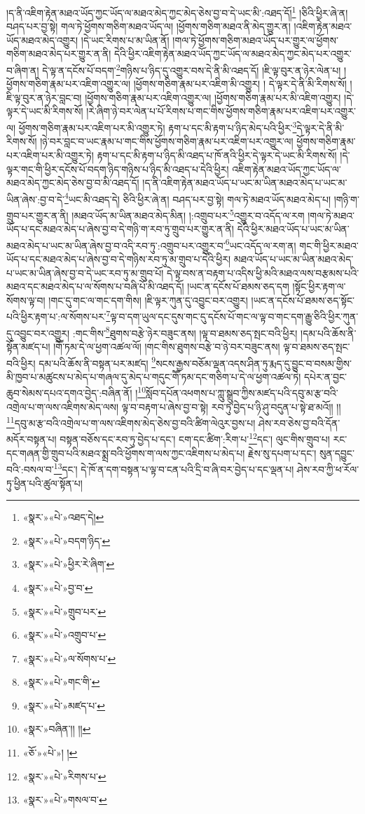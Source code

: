 །ད་ནི་འཇིག་རྟེན་མཐའ་ཡོད་ཀྱང་ཡོད་ལ་མཐའ་མེད་ཀྱང་མེད་ཅེས་བྱ་བ་དེ་ཡང་མི་:འཐད་དོ།\footnote{«སྣར་»«པེ་»འཐད་དེ།} །ཅིའི་ཕྱིར་ཞེ་ན། བཤད་པར་བྱ་སྟེ། གལ་ཏེ་ཕྱོགས་གཅིག་མཐའ་ཡོད་ལ། །ཕྱོགས་གཅིག་མཐའ་ནི་མེད་གྱུར་ན། །འཇིག་རྟེན་མཐའ་ཡོད་མཐའ་མེད་འགྱུར། །དེ་ཡང་རིགས་པ་མ་ཡིན་ནོ། །གལ་ཏེ་ཕྱོགས་གཅིག་མཐའ་ཡོད་པར་གྱུར་ལ་ཕྱོགས་གཅིག་མཐའ་མེད་པར་གྱུར་ན་ནི། དེའི་ཕྱིར་འཇིག་རྟེན་མཐའ་ཡོད་ཀྱང་ཡོད་ལ་མཐའ་མེད་ཀྱང་མེད་པར་འགྱུར་བ་ཞིག་ན། དེ་ལྟ་ན་དངོས་པོ་བདག་\footnote{«སྣར་»«པེ་»བདག་ཉིད་}གཉིས་པ་ཉིད་དུ་འགྱུར་བས་དེ་ནི་མི་འཐད་དོ། །ཇི་ལྟ་བུར་ན་ཉེར་ལེན་པ། །ཕྱོགས་གཅིག་རྣམ་པར་འཇིག་འགྱུར་ལ། །ཕྱོགས་གཅིག་རྣམ་པར་འཇིག་མི་འགྱུར། །
དེ་ལྟར་དེ་ནི་མི་རིགས་སོ། །ཇི་ལྟ་བུར་ན་ཉེར་བླང་བ། །ཕྱོགས་གཅིག་རྣམ་པར་འཇིག་འགྱུར་ལ། །ཕྱོགས་གཅིག་རྣམ་པར་མི་འཇིག་འགྱུར། །དེ་ལྟར་དེ་ཡང་མི་རིགས་སོ། །རེ་ཞིག་ཉེ་བར་ལེན་པ་པོ་རིགས་པ་གང་གིས་ཕྱོགས་གཅིག་རྣམ་པར་འཇིག་པར་འགྱུར་ལ། ཕྱོགས་གཅིག་རྣམ་པར་འཇིག་པར་མི་འགྱུར་ཏེ། རྟག་པ་དང་མི་རྟག་པ་ཉིད་མེད་པའི་ཕྱིར་\footnote{«སྣར་»«པེ་»ཕྱིར་རེ་ཞིག་}དེ་ལྟར་དེ་ནི་མི་རིགས་སོ། །ཉེ་བར་བླང་བ་ཡང་རྣམ་པ་གང་གིས་ཕྱོགས་གཅིག་རྣམ་པར་འཇིག་པར་འགྱུར་ལ། ཕྱོགས་གཅིག་རྣམ་པར་འཇིག་པར་མི་འགྱུར་ཏེ། རྟག་པ་དང་མི་རྟག་པ་ཉིད་མི་འཐད་པ་ཁོ་ནའི་ཕྱིར་དེ་ལྟར་དེ་ཡང་མི་རིགས་སོ། །དེ་ལྟར་གང་གི་ཕྱིར་དངོས་པོ་བདག་ཉིད་གཉིས་པ་ཉིད་མི་འཐད་པ་དེའི་ཕྱིར། འཇིག་རྟེན་མཐའ་ཡོད་ཀྱང་ཡོད་ལ་མཐའ་མེད་ཀྱང་མེད་ཅེས་བྱ་བ་མི་འཐད་དོ། །ད་ནི་འཇིག་རྟེན་མཐའ་ཡོད་པ་ཡང་མ་ཡིན་མཐའ་མེད་པ་ཡང་མ་ཡིན་ཞེས་:བྱ་བ་དེ་\footnote{«སྣར་»«པེ་»བྱ་བ་}ཡང་མི་འཐད་དེ། ཅིའི་ཕྱིར་ཞེ་ན། བཤད་པར་བྱ་སྟེ། གལ་ཏེ་མཐའ་ཡོད་མཐའ་མེད་པ། །གཉི་ག་གྲུབ་པར་གྱུར་ན་ནི། །མཐའ་ཡོད་མ་ཡིན་མཐའ་མེད་མིན། །:འགྲུབ་པར་\footnote{«སྣར་»«པེ་»གྲུབ་པར་}འགྱུར་བ་འདོད་ལ་རག །གལ་ཏེ་མཐའ་ཡོད་པ་དང་མཐའ་མེད་པ་ཞེས་བྱ་བ་དེ་གཉི་ག་རབ་ཏུ་གྲུབ་པར་གྱུར་ན་ནི། དེའི་ཕྱིར་མཐའ་ཡོད་པ་ཡང་མ་ཡིན་མཐའ་མེད་པ་ཡང་མ་ཡིན་ཞེས་བྱ་བ་འདི་རབ་ཏུ་:འགྲུབ་པར་འགྱུར་བ་\footnote{«སྣར་»«པེ་»འགྲུབ་པ་}ཡང་འདོད་ལ་རག་ན། གང་གི་ཕྱིར་མཐའ་ཡོད་པ་དང་མཐའ་མེད་པ་ཞེས་བྱ་བ་དེ་གཉིས་རབ་ཏུ་མ་གྲུབ་པ་དེའི་ཕྱིར། མཐའ་ཡོད་པ་ཡང་མ་ཡིན་མཐའ་མེད་པ་ཡང་མ་ཡིན་ཞེས་བྱ་བ་དེ་ཡང་རབ་ཏུ་མ་གྲུབ་པོ། དེ་ལྟ་བས་ན་བརྟག་པ་འདིས་ཕྱི་མའི་མཐའ་ལས་བརྩམས་པའི་མཐའ་དང་མཐའ་མེད་པ་ལ་སོགས་པ་བཞི་པོ་མི་འཐད་དོ། །ཡང་ན་དངོས་པོ་ཐམས་ཅད་དག །སྟོང་ཕྱིར་རྟག་ལ་སོགས་ལྟ་བ། །གང་དུ་གང་ལ་གང་དག་གིས། །ཇི་ལྟར་ཀུན་དུ་འབྱུང་བར་འགྱུར། །ཡང་ན་དངོས་པོ་ཐམས་ཅད་སྟོང་པའི་ཕྱིར་རྟག་པ་:ལ་སོགས་པར་\footnote{«སྣར་»«པེ་»ལ་སོགས་པ་}ལྟ་བ་དག་ཡུལ་དང་དུས་གང་དུ་དངོས་པོ་གང་ལ་ལྟ་བ་གང་དག་རྒྱུ་ཅིའི་ཕྱིར་ཀུན་དུ་འབྱུང་བར་འགྱུར། :གང་གིས་\footnote{«སྣར་»«པེ་»གང་གི་}ཐུགས་བརྩེ་ཉེར་བཟུང་ནས། །ལྟ་བ་ཐམས་ཅད་སྤང་བའི་ཕྱིར། །དམ་པའི་ཆོས་ནི་སྟོན་མཛད་པ། །གཽ་ཏམ་དེ་ལ་ཕྱག་འཚལ་ལོ། །གང་གིས་ཐུགས་བརྩེ་བ་ཉེ་བར་བཟུང་ནས། ལྟ་བ་ཐམས་ཅད་སྤང་བའི་ཕྱིར། དམ་པའི་ཆོས་ནི་བསྟན་པར་མཛད། \footnote{«སྣར་»«པེ་»མཛད་པ་}སངས་རྒྱས་བཅོམ་ལྡན་འདས་ཤིན་ཏུ་རྨད་དུ་བྱུང་བ་བསམ་གྱིས་མི་ཁྱབ་པ་མཚུངས་པ་མེད་པ་གཞལ་དུ་མེད་པ་གདུང་གཽ་ཏམ་དང་གཅིག་པ་དེ་ལ་ཕྱག་འཚལ་ཏེ། དཔེར་ན་བྱང་ཆུབ་སེམས་དཔའ་དགའ་བྱེད་:བཞིན་ནོ། །\footnote{«སྣར་»བཞིན་།། །།}སློབ་དཔོན་འཕགས་པ་ཀླུ་སྒྲུབ་ཀྱིས་མཛད་པའི་དབུ་མ་རྩ་བའི་འགྲེལ་པ་ག་ལས་འཇིགས་མེད་ལས། ལྟ་བ་བརྟག་པ་ཞེས་བྱ་བ་སྟེ། རབ་ཏུ་བྱེད་པ་ཉི་ཤུ་བདུན་པ་སྟེ་ཐ་མའོ།། །།\footnote{«ཅོ་»«པེ་»། །}དབུ་མ་རྩ་བའི་འགྲེལ་པ་ག་ལས་འཇིགས་མེད་ཅེས་བྱ་བའི་ཚིག་ལེའུར་བྱས་པ། ཤེས་རབ་ཅེས་བྱ་བའི་དོན་མདོར་བསྟན་པ། བསྟན་བཅོས་དང་རབ་ཏུ་བྱེད་པ་དང་། ངག་དང་ཚིག་:རིག་པ་\footnote{«སྣར་»«པེ་»རིགས་པ་}དང་། ལུང་གིས་གྲུབ་པ། རང་དང་གཞན་གྱི་གྲུབ་པའི་མཐའ་སྨྲ་བའི་ཕྱོགས་ག་ལས་ཀྱང་འཇིགས་པ་མེད་པ། རྗེས་སུ་དཔག་པ་དང་། སུན་དབྱུང་བའི་:བསལ་བ་\footnote{«སྣར་»«པེ་»གསལ་བ་}དང་། དེ་ཁོ་ན་དག་བསྟན་པ་ལྟ་བ་ངན་པའི་དྲི་བ་ཞི་བར་བྱེད་པ་དང་ལྡན་པ། ཤེས་རབ་ཀྱི་ཕ་རོལ་ཏུ་ཕྱིན་པའི་ཚུལ་སྟོན་པ། 